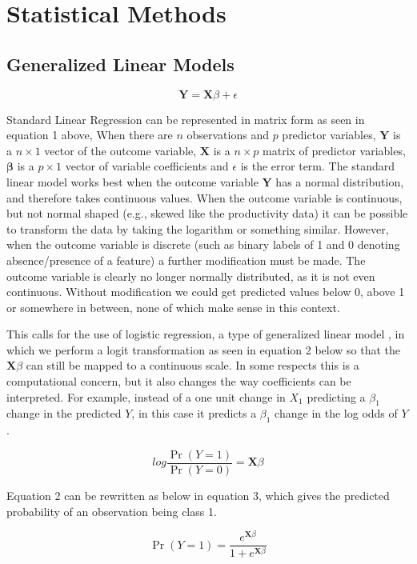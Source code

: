 \documentclass{article}
\newcommand{\bX}{\mathbf{X}}
\newcommand{\bY}{\mathbf{Y}}
\newcommand{\bbeta}{\mathbf{\beta}}
\begin{document}
\section{Statistical Methods} \label{stat_methods}

\subsection{Generalized Linear Models}

\[\bY = \bX\beta + \epsilon \tag{1}\]

Standard Linear Regression can be represented in matrix form as seen in equation 1 above, When there are $n$ observations and $p$ predictor variables,  $\bY$ is a $n \times 1$ vector of the outcome variable, $\bX$ is a $n \times p$ matrix of predictor variables, $\bbeta$ is a $p \times 1$ vector of variable coefficients and $\epsilon$ is the error 
term. The standard linear model works best when the outcome variable $\bY$ has a normal distribution, and therefore takes 
continuous values. When the outcome variable is continuous, but not normal shaped (e.g., skewed like the productivity 
data) it can be possible to transform the data by taking the logarithm or something similar. However, when the outcome 
variable is discrete (such as binary labels of 1 and 0 denoting absence/presence of a feature) a further modification must be made. The outcome variable is clearly no longer normally distributed, as it is not even continuous. Without modification we could get predicted values below 0, above 1 or somewhere in between, none of which make sense in this context.

This calls for the use of logistic regression, a type of generalized linear model \cite{dobson}, in which we perform a logit transformation as seen in equation 2 below so that the 
$\bX\beta$ can still be mapped to a continuous scale. In some respects this is a computational concern, but it also changes the 
way coefficients can be interpreted. For example, instead of a one unit change in $X_1$ predicting a $\beta_1$ change in the predicted $Y$, 
in this case it predicts a $\beta_1$ change in the log odds of $Y$.

\[log \frac{\Pr(Y = 1)}{\Pr(Y = 0)} = \bX\beta \tag{2}\]

Equation 2 can be rewritten as below in equation 3, which gives the predicted probability of an observation being class 1.

\[ \Pr(Y = 1) = \frac{e^{\bX\beta}}{1 + e^{\bX\beta}} \tag{3}\]
\end{document}
